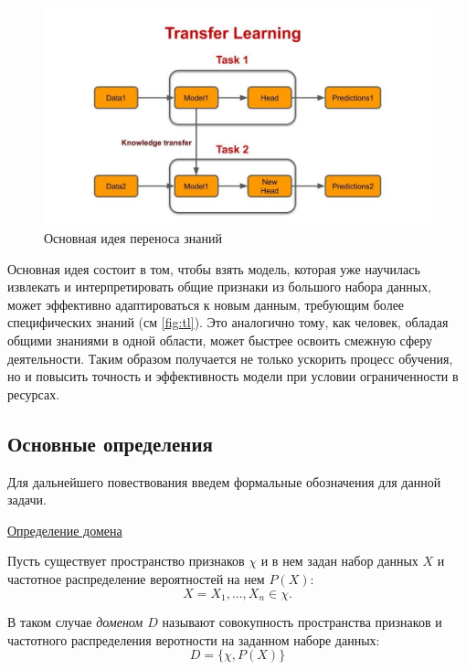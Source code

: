 \begin{figure}[h]
	\centering
	\includegraphics[width=\textwidth]{./images/TL_medium.jpg}
	\caption{Основная идея переноса знаний}
	\label{fig:tl}
\end{figure}

Основная идея состоит в том, чтобы взять модель, которая уже научилась извлекать и интерпретировать общие признаки из большого набора данных, может эффективно адаптироваться к новым данным, требующим более специфических знаний (см \autoref{fig:tl}). Это аналогично тому, как человек, обладая общими знаниями в одной области, может быстрее освоить смежную сферу деятельности. Таким образом получается не только ускорить процесс обучения, но и повысить точность и эффективность модели при условии ограниченности в ресурсах. 

\subsection{Основные определения}

Для дальнейшего повествования введем формальные обозначения для данной задачи.

\underline{Определение домена}

Пусть существует пространство признаков $\chi$ и в нем задан набор данных $X$ и частотное распределение вероятностей на нем $P(X)$:
\begin{equation}
	X = {X_1, ..., X_n} \in \chi.
\end{equation}

В таком случае \textit{доменом $D$} называют совокупность пространства признаков и частотного распределения веротности на заданном наборе данных:
\begin{equation}
D = \{\chi, P(X)\}
\end{equation}

